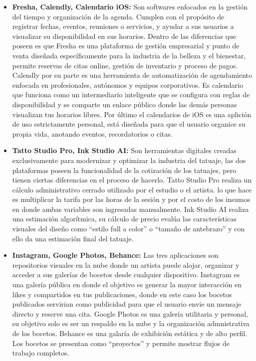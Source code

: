 \begin{itemize}
  \item \textbf{Fresha, Calendly, Calendario iOS:} Son softwares enfocados en la gestión del tiempo y organización de la agenda. Cumplen con el propósito de registrar fechas, eventos, reuniones o servicios, y ayudar a sus usuarios a visualizar su disponibilidad en sus horarios. Dentro de las diferencias que poseen es que Fresha\cite{fresha} es una plataforma de gestión empresarial y punto de venta diseñada específicamente para la industria de la belleza y el bienestar, permite reservas de citas online, gestión de inventario y proceso de pagos. Calendly\cite{calendly} por su parte es una herramienta de automatización de agendamiento enfocada en profesionales, autónomos y equipos corporativos. Es calendario que funciona como un intermediario inteligente que se configura con reglas de disponibilidad y se comparte un enlace público donde las demás personas visualizan tus horarios libres. Por último el calendarios de iOS\cite{calendarioios} es una aplición de uso estrictamente personal, está diseñada para que el usuario organice su propia vida, anotando eventos, recordatorios o citas.

  \item \textbf{Tatto Studio Pro, Ink Studio AI:} Son herramientas digitales creadas exclusivamente para modernizar y optimizar la industria del tatuaje, las dos plataformas poseen la funcionalidad de la cotización de los tatuajes, pero tienen ciertas diferencias en el proceso de hacerlo. Tatto Studio Pro\cite{tattoostudiopro} realiza un cálculo administrativo cerrado utilizado por el estudio o el artista. lo que hace es multiplicar la tarifa por las horas de la sesión y por el costo de los insumos en donde ambas variables son ingresadas manualmente. Ink Studio AI\cite{inkstudioai} realiza una estimación algorítmica, su cálculo de precio evalúa las características visuales del diseño como ``estilo full a color'' o ``tamaño de antebrazo'' y con ello da una estimación final del tatuaje.

  \item \textbf{Instagram, Google Photos, Behance:} Las tres aplicaciones son repositorios visuales en la nube donde un artista puede alojar, organizar y acceder a sus galerías de bocetos desde cualquier dispositivo. Instagram\cite{instagram} es una galería pública en donde el objetivo es generar la mayor interacción en likes y compartidos en tus publicaciones, donde en este caso los bocetos publicados servirian como publicidad para que el usuario envie un mensaje directo y reserve una cita. Google Photos\cite{googlephotos} es una galería utilitaria y personal, su objetivo solo es ser un respaldo en la nube y la organización admnistrativa de los bocetos. Behance\cite{behance} es una galaría de exhibición estática y de alto perfil. Los bocetos se presentan como ``proyectos'' y permite mostrar flujos de trabajo completos.


\end{itemize}
